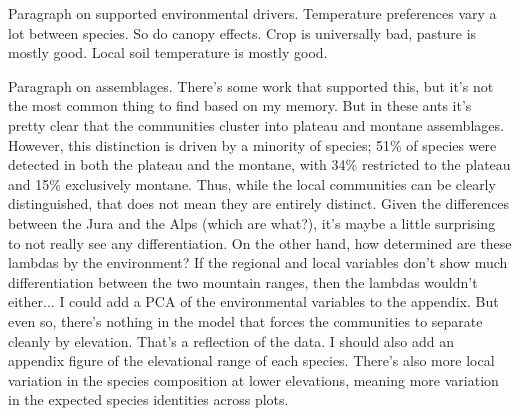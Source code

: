 \documentclass[preprint,review,times,12pt]{elsarticle}
\begin{document}
Paragraph on supported environmental drivers. Temperature preferences vary a lot between species. So do canopy effects. Crop is universally bad, pasture is mostly good. Local soil temperature is mostly good. 

Paragraph on assemblages. There's some work that supported this, but it's not the most common thing to find based on my memory. But in these ants it's pretty clear that the communities cluster into plateau and montane assemblages. However, this distinction is driven by a minority of species; 51\% of species were detected in both the plateau and the montane, with 34\% restricted to the plateau and 15\% exclusively montane. Thus, while the local communities can be clearly distinguished, that does not mean they are entirely distinct. Given the differences between the Jura and the Alps (which are what?), it's maybe a little surprising to not really see any differentiation. On the other hand, how determined are these lambdas by the environment? If the regional and local variables don't show much differentiation between the two mountain ranges, then the lambdas wouldn't either... I could add a PCA of the environmental variables to the appendix. But even so, there's nothing in the model that forces the communities to separate cleanly by elevation. That's a reflection of the data. I should also add an appendix figure of the elevational range of each species. There's also more local variation in the species composition at lower elevations, meaning more variation in the expected species identities across plots. 
\end{document}
